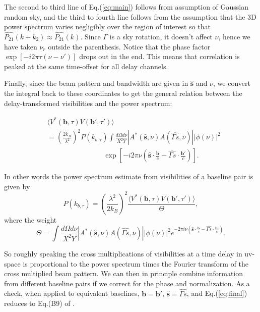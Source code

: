 \documentclass[preprint2,numberedappendix,tighten,twocolappendix]{aastex6}  %
\renewcommand\[{\begin{equation}}
\renewcommand\]{\end{equation}}
\begin{document}
The second to third line of Eq.(\ref{eq:main}) follows from assumption of Gaussian random
sky, and the third to fourth line follows from the assumption that
the 3D power spectrum varies negligibly over the region of interest
so that $\hat{P_{21}}(k+k_{2})\approx\hat{P_{21}}(k)$. Since $\Gamma$
is a sky rotation, it doesn't affect $\nu$, hence we have taken $\nu_{r}$
outside the parenthesis. Notice that the phase factor $\exp\left[-i2\pi\tau\left(\nu-\nu'\right)\right]$
drops out in the end. This means that correlation is peaked at the same time-offset for all delay channels. 

Finally, since the beam pattern and bandwidth are given in $\hat{\boldsymbol{s}}$
and $\nu$, we convert the integral back to these coordinates to get
the general relation between the delay-transformed visibilities and
the power spectrum:

\begin{equation}
\begin{aligned} & \langle V^{*}(\boldsymbol{b},\tau)V(\boldsymbol{b'},\tau')\rangle\\
 & =\left(\frac{2k_{B}}{\lambda^{2}}\right)^{2}P(k_{b,\tau})\int\frac{d\Omega d\nu}{X^{2}Y}|A^{*}(\hat{\boldsymbol{s}},\nu)A(\hat{\Gamma s},\nu)||\phi(\nu)|^{2}\\
 & \qquad \qquad \qquad \qquad \exp\left[-i2\pi\nu\left(\hat{\boldsymbol{s}}\cdot\frac{\boldsymbol{b}}{c}-\hat{\Gamma s}\cdot\frac{\boldsymbol{b'}}{c}\right)\right].\end{aligned}
\label{eq:final}
\end{equation}

In other words the power spectrum estimate from visibilities of a baseline pair is given by 
\begin{equation}
 P(k_{b,\tau}) = \left(\frac{\lambda^{2}}{2k_{B}}\right)^{2} \frac{\langle V^{*}(\boldsymbol{b},\tau)V(\boldsymbol{b'},\tau')\rangle}{\Theta}, 
 \label{eq:opp}
\end{equation}
where the weight
\begin{equation}
\Theta =\int\frac{d\Omega d\nu}{X^{2}Y}|A^{*}(\hat{\boldsymbol{s}},\nu)A(\hat{\Gamma s},\nu)||\phi(\nu)|^{2} e^{-2\pi i\nu\left(\hat{\boldsymbol{s}}\cdot\frac{\boldsymbol{b}}{c}-\hat{\Gamma s}\cdot\frac{\boldsymbol{b'}}{c}\right)}. 
\label{eq:Theta}
\end{equation}



So roughly speaking the cross multiplications of visibilities at a time delay
in uv-space is proportional to the power spectrum times the Fourier
transform of the cross multiplied beam pattern. We can then in principle
combine information from different baseline pairs if we correct for
the phase and normalization. As a check, when applied to equivalent baselines,
$\boldsymbol{b}=\boldsymbol{b'}$, $\hat{\boldsymbol{s}}=\hat{\Gamma s}$, and Eq.(\ref{eq:final}) reduces to Eq.(B9) of \cite{paper32}. 
\end{document}
